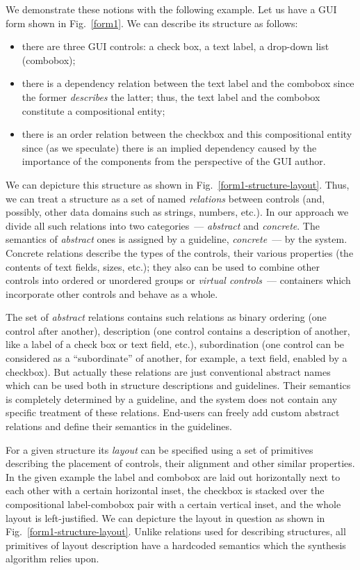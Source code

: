 We demonstrate these notions with the following example. Let us have a GUI form shown in Fig.~\ref{form1}. We can describe its structure as follows:

\begin{itemize}
\item there are three GUI controls: a check box, a text label, a drop-down list (combobox);
\item there is a dependency relation between the text label and the combobox since the former \emph{describes} the
  latter; thus, the text label and the combobox constitute a compositional entity;
\item there is an order relation between the checkbox and this compositional entity
  since (as we speculate) there is an implied dependency caused by the importance of the components
  from the perspective of the GUI author.
\end{itemize}

We can depicture this structure as shown in Fig.~\ref{form1-structure-layout}.
Thus, we can treat a structure as a set of named \emph{relations} between controls (and, possibly, other
data domains such as strings, numbers, etc.). In our approach we divide all such relations into two categories~---
\emph{abstract} and \emph{concrete}. The semantics of \emph{abstract} ones is assigned by a guideline, \emph{concrete}~---
by the system. Concrete relations describe the types of the controls, their various properties (the contents of
text fields, sizes, etc.); they also can be used to combine other controls into ordered or unordered groups or
\emph{virtual controls}~--- containers which incorporate other controls and behave as a whole.

The set of \emph{abstract} relations contains such relations as binary ordering (one control after another), description (one
control contains a description of another, like a label of a check box or text field, etc.), subordination (one control can
be considered as a ``subordinate'' of another, for example, a text field, enabled by a checkbox). But actually these
relations are just conventional abstract names which can be used both in structure descriptions and guidelines. Their
semantics is completely determined by a guideline, and the system does not contain any specific treatment of
these relations. End-users can freely add custom abstract relations and define their semantics in the guidelines.

For a given structure its \emph{layout} can be specified using a set of primitives describing the placement
of controls, their alignment and other similar properties. In the given example the label and combobox are
laid out horizontally next to each other with a certain horizontal inset, the checkbox is stacked over the compositional
label-combobox pair with a certain vertical inset, and the whole layout is left-justified. We can depicture the
layout in question as shown in Fig.~\ref{form1-structure-layout}. Unlike relations used for
describing structures, all primitives of layout description have a hardcoded semantics which the 
synthesis algorithm relies upon.

